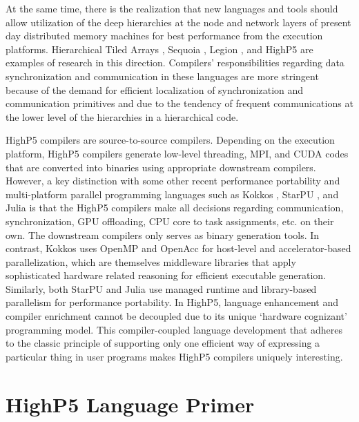 \documentclass[ASNA,twocolumn]{USG} %
\begin{document}
{At the same time, there is {\color{red} the} realization that new languages and tools should allow utilization of the deep hierarchies at the node and network layers of present day distributed memory machines for best performance from the execution platforms. Hierarchical Tiled Arrays \citep{10.1145/1122971.1122981}, Sequoia \citep{10.1145/1188455.1188543}, Legion \citep{10.5555/2388996.2389086}, and HighP5 \citep{Yanhaona:2015:RTA:2723772.2723774} are examples of research in this direction. Compilers' responsibilities regarding data synchronization and communication in these languages are more stringent because of the demand for efficient localization of synchronization and communication primitives and due to the tendency of frequent communications at the lower level of the hierarchies in a hierarchical code.
	
HighP5 compilers are source-to-source compilers. Depending on the execution platform, HighP5 compilers generate low-level threading, MPI, and CUDA codes that are converted into binaries using appropriate downstream compilers. However, a key distinction with some other recent performance portability and multi-platform parallel programming languages such as Kokkos \citep{trott2021kokkos}, StarPU \citep{augonnet2009starpu}, and Julia \citep{lin2021comparing} is that the HighP5 compilers make all decisions regarding communication, synchronization, GPU offloading, CPU core to task assignments, etc. on their own. The downstream compilers only serves as binary generation tools. In contrast, Kokkos uses OpenMP \citep{gayatri2023kokkos} and OpenAcc \citep{valero2022kokkacc} for host-level and accelerator-based parallelization, which are themselves middleware libraries that apply sophisticated hardware related reasoning for efficient executable generation. Similarly, both StarPU and Julia \citep{teichgraber2022julia} use managed runtime and library-based parallelism for performance portability. In HighP5, language enhancement and compiler enrichment cannot be decoupled due to its unique `hardware cognizant' programming model. This compiler-coupled language development that adheres to the classic principle of supporting only one efficient way of expressing a particular thing in user programs \citep{wirth1974design} makes HighP5 compilers uniquely interesting.   
	
\section{HighP5 Language Primer}
\label{sec:language-primer}

}
\end{document}

